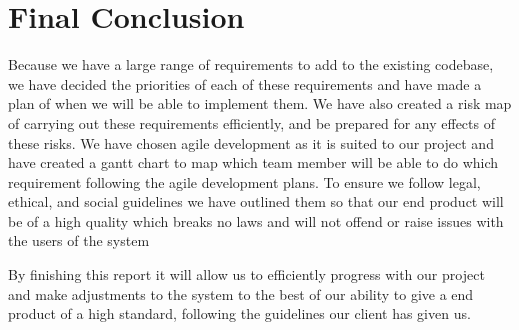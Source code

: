 \section{Final Conclusion}
Because we have a large range of requirements to add to the existing codebase, we have decided the priorities of each of these requirements and have made a plan of when we will be able to implement them. We have also created a risk map of carrying out these requirements efficiently, and be prepared for any effects of these risks. 
We have chosen agile development as it is suited to our project and have created a gantt chart to map which team member will be able to do which requirement following the agile development plans. 
To ensure we follow legal, ethical, and social guidelines we have outlined them so that our end product will be of a high quality which breaks no laws and will not offend or raise issues with the users of the system

By finishing this report it will allow us to efficiently progress with our project and make adjustments to the system to the best of our ability to give a end product of a high standard, following the guidelines our client has given us.

  
